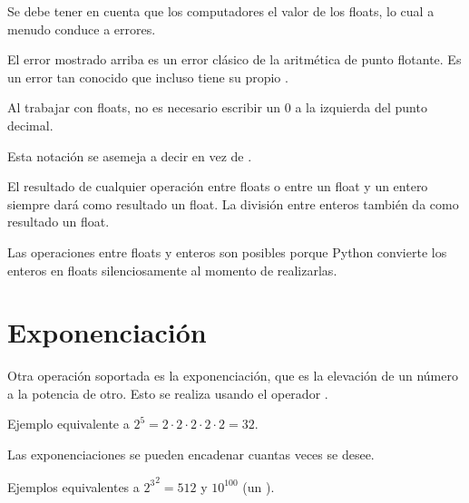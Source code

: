
Se debe tener en cuenta que los computadores  el valor de los floats, lo cual a menudo conduce a errores.


El error mostrado arriba es un error clásico de la aritmética de punto flotante.
Es un error tan conocido que incluso tiene su propio .

Al trabajar con floats, no es necesario escribir un 0 a la izquierda del punto decimal.


Esta notación se asemeja a decir  en vez de .

El resultado de cualquier operación entre floats o entre un float y un entero siempre dará como resultado un float.
La división entre enteros también da como resultado un float.


Las operaciones entre floats y enteros son posibles porque Python convierte los enteros en floats silenciosamente al momento de realizarlas.

\section{Exponenciación}

Otra operación soportada es la exponenciación, que es la elevación de un número a la potencia de otro.
Esto se realiza usando el operador \ttt{**}.


Ejemplo equivalente a $2 ^ 5 = 2\cdot 2\cdot 2\cdot 2\cdot 2 = 32$.


Las exponenciaciones se pueden encadenar cuantas veces se desee.

Ejemplos equivalentes a ${2 ^ 3} ^ 2 = 512$ y $10 ^ {100}$ (un ).

